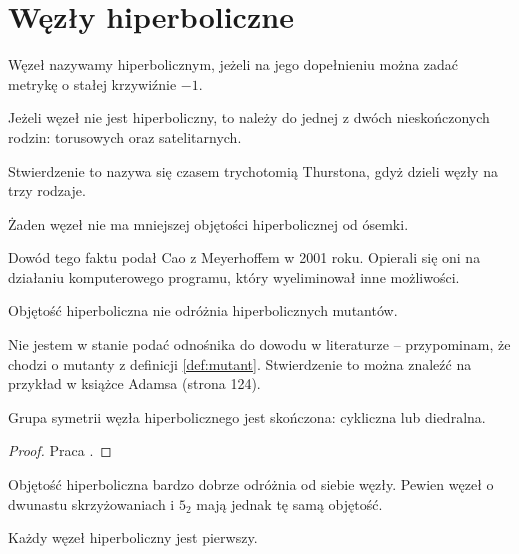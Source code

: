 \section{Węzły hiperboliczne} %
\label{sec:hyperbolic}
\begin{definition}
    Węzeł nazywamy hiperbolicznym, jeżeli na jego dopełnieniu można zadać metrykę o stałej krzywiźnie $-1$. 
\end{definition}

\begin{theorem}[Thurston, 1978]
    Jeżeli węzeł nie jest hiperboliczny, to należy do jednej z dwóch nieskończonych rodzin: torusowych oraz satelitarnych.
\end{theorem}

Stwierdzenie to nazywa się czasem trychotomią Thurstona, gdyż dzieli węzły na trzy rodzaje.

\begin{proposition}
    Żaden węzeł nie ma mniejszej objętości hiperbolicznej od ósemki.
\end{proposition}

Dowód tego faktu podał Cao z Meyerhoffem w 2001 roku.
Opierali się oni na działaniu komputerowego programu, który wyeliminował inne możliwości.

\begin{proposition}
    Objętość hiperboliczna nie odróżnia hiperbolicznych mutantów.
\end{proposition}

Nie jestem w stanie podać odnośnika do dowodu w literaturze -- przypominam, że chodzi o mutanty z definicji \ref{def:mutant}.
Stwierdzenie to można znaleźć na przykład w książce Adamsa (strona 124).

\begin{proposition}
    Grupa symetrii węzła hiperbolicznego jest skończona: cykliczna lub diedralna.
\end{proposition}

\begin{proof}
    Praca \cite{kodama92}.
\end{proof}

Objętość hiperboliczna bardzo dobrze odróżnia od siebie węzły.
Pewien węzeł o dwunastu skrzyżowaniach i $5_2$ mają jednak tę samą objętość.

\begin{proposition}
    Każdy węzeł hiperboliczny jest pierwszy.
\end{proposition}


